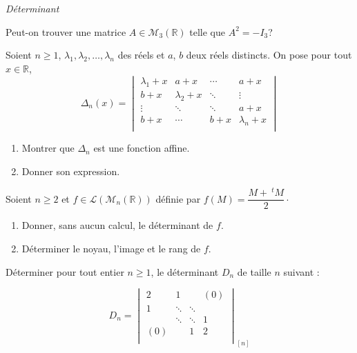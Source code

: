 \documentclass[a4paper,10pt]{report}
\begin{document}
\medskip

\begin{center}
\textit{{ {\large Déterminant}}}
\end{center}

\medskip


\begin{Exercice}{} Peut-on trouver une matrice $A \in \mathcal{M}_3(\mathbb{R})$ telle que $A^2= - I_3$?
\end{Exercice}

\begin{Exercice}{} Soient $n \geq 1$, $\lambda_1 ,\lambda_2 ,\ldots,\lambda_n$ des réels et $a$, $b$ deux réels distincts. On pose pour tout $x \in \mathbb{R}$,
    \[
    \Delta_n(x) =
    \begin{vmatrix}
        {\lambda_1 + x} & {a + x} & \cdots & {a + x} \\
        {b + x} & {\lambda_2 + x} & \ddots & \vdots \\
        \vdots & \ddots & \ddots & {a + x} \\
        {b + x} & \cdots & {b + x} & {\lambda_n + x} \\
    \end{vmatrix}    
    \]
    \begin{enumerate}
      \item Montrer que $\Delta_n$ est une fonction affine.
      \item Donner son expression.
    \end{enumerate}
\end{Exercice}


\begin{Exercice}{} Soient $n \geq 2$ et $f \in \mathcal{L}(\mathcal{M}_n(\mathbb{R}))$ définie par $f(M) = \dfrac{M+~^tM}{2}\cdot$

\begin{enumerate}
\item Donner, sans aucun calcul, le déterminant de $f$.
\item Déterminer le noyau, l'image et le rang de $f$. 
\end{enumerate}
\end{Exercice}


\begin{Exercice}{} Déterminer pour tout entier $n \geq 1$, le déterminant $D_n$ de taille $n$ suivant :

\[
    D_n =
    \begin{vmatrix}
        2 & 1 & {} & {(0)} \\
        1 & \ddots & \ddots & {} \\
        {} & \ddots & \ddots & 1 \\
        {(0)} & {} & 1 & 2 \\
    \end{vmatrix}_{[n]}
    \]
\end{Exercice} 
\end{document}
